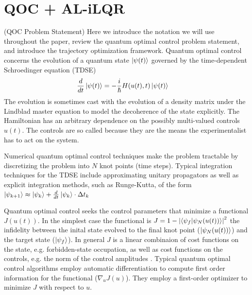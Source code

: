 \documentclass[
  amsfonts,
  amsmath,
  tbtags,
  amssymb,
  aps,
  nobibnotes,
  twocolumn,
  superscriptaddress,
]{revtex4-2}
\begin{document}
\section{QOC + AL-iLQR}
(QOC Problem Statement) Here we introduce the notation
we will use throughout the paper,
review the quantum optimal control problem statement,
and introduce the trajectory optimization framework.
Quantum optimal control concerns the evolution of
a quantum state $\ket{\psi(t)}$ governed by the time-dependent
Schroedinger equation (TDSE)
\label{eq:tdse}
\begin{align}
  \frac{d}{dt} \ket{\psi(t)} &= -\frac{i}{\hbar} H(u(t), t) \ket{\psi(t)}
\end{align}
The evolution is sometimes cast with the evolution
of a density matrix under the Lindblad master equation to
model the decoherence of the state explicitly. The Hamiltonian
has an arbitrary dependence on the possibly multi-valued controls $u(t)$.
The controls are so called because they are the means the experimentalist has to
act on the system.

Numerical quantum optimal control techniques make
the problem tractable by discretizing the problem into $N$
knot points (time steps). Typical integration techniques for the TDSE include
approximating unitary propagators as well as explicit integration methods,
such as Runge-Kutta, of the form
$\ket{\psi_{k + 1}} \approx \ket{\psi_{k}} + \frac{d}{dt} \ket{\psi_{k}} \cdot \Delta t_{k}$

Quantum optimal control seeks the control
parameters that minimize a functional $J(u(t))$.
In the simplest case the functional is
$J = 1 - {\lvert \braket{\psi_{f} \lvert \psi_{N}(u(t))} \rvert}^{2}$
the infidelity between the inital state evolved
to the final knot point ($\ket{\psi_{N}(u(t))}$)
and the target state ($\ket{\psi_{f}}$). In general
$J$ is a linear combinaion of cost functions on the state, e.g.
forbidden-state occupation, as well as
cost functions on the controls, e.g. the norm of the control amplitudes
\cite{leung2017speedup}. Typical quantum optimal control
algorithms employ automatic differentiation
to compute first order information for the functional ($\nabla_{u} J(u)$).
They employ a first-order optimizer to minimize $J$ with respect to $u$.
\end{document}

